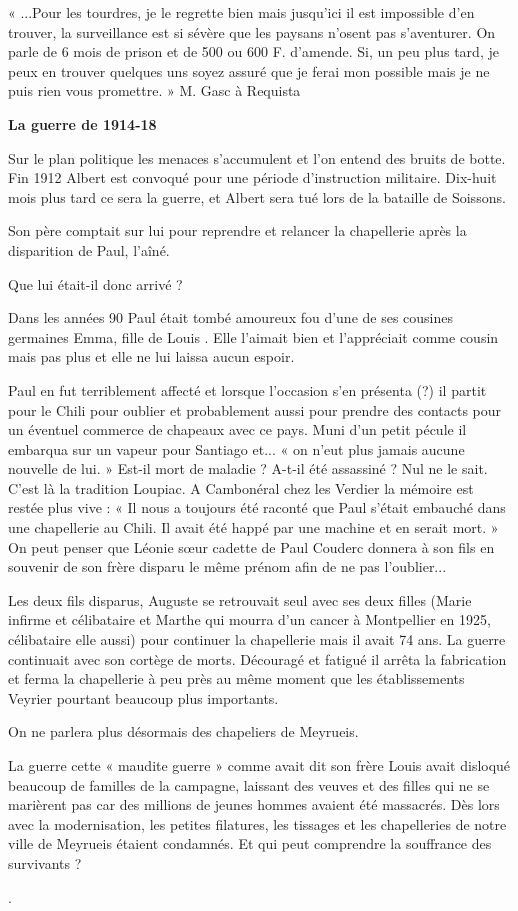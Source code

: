 
« ...Pour les tourdres, je le regrette bien mais jusqu’ici il est impossible d’en trouver, la
surveillance est si sévère que les paysans n’osent pas s’aventurer. On parle de 6 mois de
prison et de 500 ou 600 F. d’amende. Si, un peu plus tard, je peux en trouver quelques uns soyez
assuré que je ferai mon possible mais je ne puis rien vous promettre. » M. Gasc à Requista

\medskip

\textbf{La guerre de 1914-18}

Sur le plan politique les menaces s’accumulent et l’on entend des bruits de botte. Fin 1912
Albert est convoqué pour une période d’instruction militaire. Dix-huit mois plus tard ce sera la
guerre, et Albert sera tué lors de la bataille de Soissons.

Son père comptait sur lui pour reprendre et relancer la chapellerie après la disparition de Paul,
l’aîné.

\medskip

Que lui était-il donc arrivé ?

Dans les années 90 Paul était tombé amoureux fou d’une de ses cousines germaines Emma,
fille de Louis . Elle l’aimait bien et l’appréciait comme cousin mais pas plus et elle ne lui
laissa aucun espoir.

Paul en fut terriblement affecté et lorsque l’occasion s’en présenta (?) il partit pour le Chili
pour oublier et probablement aussi pour prendre des contacts pour un éventuel commerce de
chapeaux avec ce pays. Muni d’un petit pécule il embarqua sur un vapeur pour Santiago et...
« on n’eut plus jamais aucune nouvelle de lui. » Est-il mort de maladie ? A-t-il été assassiné ?
Nul ne le sait. C’est là la tradition Loupiac. A Cambonéral chez les Verdier la mémoire est
restée plus vive : « Il nous a toujours été raconté que Paul s’était embauché dans une
chapellerie au Chili. Il avait été happé par une machine et en serait mort. » On peut penser
que Léonie sœur cadette de Paul Couderc donnera à son fils en souvenir de son frère disparu
le même prénom afin de ne pas l’oublier...

Les deux fils disparus, Auguste se retrouvait seul avec ses deux filles (Marie infirme et
célibataire et Marthe qui mourra d’un cancer à Montpellier en 1925, célibataire elle aussi)
pour continuer la chapellerie mais il avait 74 ans. La guerre continuait avec son cortège de
morts. Découragé et fatigué il arrêta la fabrication et ferma la chapellerie à peu près au même
moment que les établissements Veyrier pourtant beaucoup plus importants.

On ne parlera plus désormais des chapeliers de Meyrueis.

La guerre cette « maudite guerre » comme avait dit son frère Louis avait disloqué beaucoup
de familles de la campagne, laissant des veuves et des filles qui ne se marièrent pas car des
millions de jeunes hommes avaient été massacrés. Dès lors avec la modernisation, les petites
filatures, les tissages et les chapelleries de notre ville de Meyrueis étaient condamnés. Et qui
peut comprendre la souffrance des survivants ?

.
